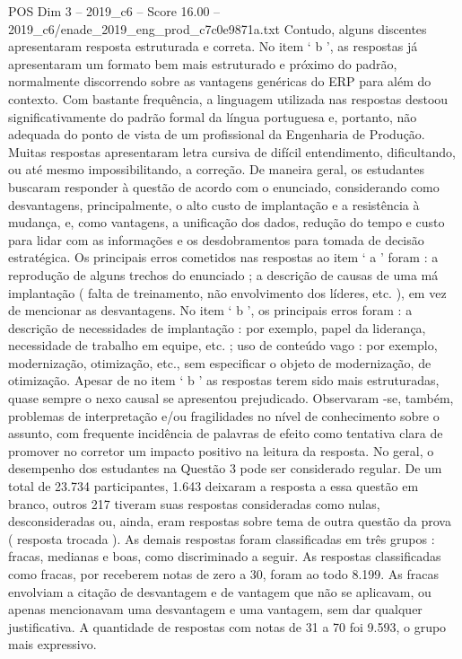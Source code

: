 \begin{textsample}{POS Dim 3 – 2019\_c6 – Score 16.00 – 2019\_c6/enade\_2019\_eng\_prod\_c7c0e9871a.txt}
Contudo, alguns discentes apresentaram resposta estruturada e correta.
No item ‘ b ’, as respostas já apresentaram um formato bem mais estruturado e próximo do padrão, normalmente discorrendo sobre as vantagens genéricas do ERP para além do contexto.
Com bastante frequência, a linguagem utilizada nas respostas destoou significativamente do padrão formal da língua portuguesa e, portanto, não adequada do ponto de vista de um profissional da Engenharia de Produção.
Muitas respostas apresentaram letra cursiva de difícil entendimento, dificultando, ou até mesmo impossibilitando, a correção.
De maneira geral, os estudantes buscaram responder à questão de acordo com o enunciado, considerando como desvantagens, principalmente, o alto custo de implantação e a resistência à mudança, e, como vantagens, a unificação dos dados, redução do tempo e custo para lidar com as informações e os desdobramentos para tomada de decisão estratégica.
Os principais erros cometidos nas respostas ao item ‘ a ’ foram : a reprodução de alguns trechos do enunciado ; a descrição de causas de uma má implantação ( falta de treinamento, não envolvimento dos líderes, etc. ), em vez de mencionar as desvantagens.
No item ‘ b ’, os principais erros foram : a descrição de necessidades de implantação : por exemplo, papel da liderança, necessidade de trabalho em equipe, etc. ; uso de conteúdo vago : por exemplo, modernização, otimização, etc., sem especificar o objeto de modernização, de otimização.
Apesar de no item ‘ b ’ as respostas terem sido mais estruturadas, quase sempre o nexo causal se apresentou prejudicado.
Observaram -se, também, problemas de interpretação e/ou fragilidades no nível de conhecimento sobre o assunto, com frequente incidência de palavras de efeito como tentativa clara de promover no corretor um impacto positivo na leitura da resposta.
No geral, o desempenho dos estudantes na Questão 3 pode ser considerado regular.
De um total de 23.734 participantes, 1.643 deixaram a resposta a essa questão em branco, outros 217 tiveram suas respostas consideradas como nulas, desconsideradas ou, ainda, eram respostas sobre tema de outra questão da prova ( resposta trocada ).
As demais respostas foram classificadas em três grupos : fracas, medianas e boas, como discriminado a seguir.
As respostas classificadas como fracas, por receberem notas de zero a 30, foram ao todo 8.199.
As fracas envolviam a citação de desvantagem e de vantagem que não se aplicavam, ou apenas mencionavam uma desvantagem e uma vantagem, sem dar qualquer justificativa.
A quantidade de respostas com notas de 31 a 70 foi 9.593, o grupo mais expressivo.

\end{textsample}
